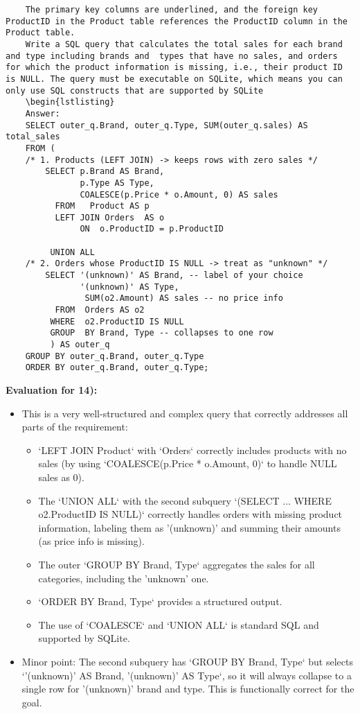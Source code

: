 \documentclass{article}
\begin{document}
\begin{enumerate}[label=\textbf{Question \arabic*.}]
\begin{lstlisting}
    The primary key columns are underlined, and the foreign key ProductID in the Product table references the ProductID column in the Product table.
    Write a SQL query that calculates the total sales for each brand and type including brands and  types that have no sales, and orders for which the product information is missing, i.e., their product ID is NULL. The query must be executable on SQLite, which means you can only use SQL constructs that are supported by SQLite
    \begin{lstlisting}
    Answer:
    SELECT outer_q.Brand, outer_q.Type, SUM(outer_q.sales) AS total_sales
    FROM (
    /* 1. Products (LEFT JOIN) -> keeps rows with zero sales */
        SELECT p.Brand AS Brand,
               p.Type AS Type,
               COALESCE(p.Price * o.Amount, 0) AS sales
          FROM   Product AS p
          LEFT JOIN Orders  AS o
               ON  o.ProductID = p.ProductID

         UNION ALL
    /* 2. Orders whose ProductID IS NULL -> treat as "unknown" */
        SELECT '(unknown)' AS Brand, -- label of your choice
               '(unknown)' AS Type,
                SUM(o2.Amount) AS sales -- no price info
          FROM  Orders AS o2
         WHERE  o2.ProductID IS NULL
         GROUP  BY Brand, Type -- collapses to one row
         ) AS outer_q
    GROUP BY outer_q.Brand, outer_q.Type
    ORDER BY outer_q.Brand, outer_q.Type;
    \end{lstlisting}
    \textbf{Evaluation for 14):}
    \begin{itemize}
        \item This is a very well-structured and complex query that correctly addresses all parts of the requirement:
            \begin{itemize}
                \item `LEFT JOIN Product` with `Orders` correctly includes products with no sales (by using `COALESCE(p.Price * o.Amount, 0)` to handle NULL sales as 0).
                \item The `UNION ALL` with the second subquery `(SELECT ... WHERE o2.ProductID IS NULL)` correctly handles orders with missing product information, labeling them as '(unknown)' and summing their amounts (as price info is missing).
                \item The outer `GROUP BY Brand, Type` aggregates the sales for all categories, including the 'unknown' one.
                \item `ORDER BY Brand, Type` provides a structured output.
                \item The use of `COALESCE` and `UNION ALL` is standard SQL and supported by SQLite.
            \end{itemize}
        \item Minor point: The second subquery has `GROUP BY Brand, Type` but selects `'(unknown)' AS Brand, '(unknown)' AS Type`, so it will always collapse to a single row for '(unknown)' brand and type. This is functionally correct for the goal.


\end{itemize}
\end{enumerate}
\end{document}
